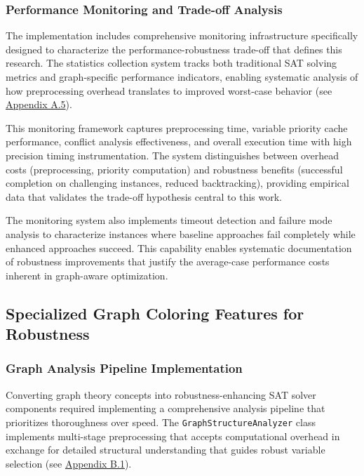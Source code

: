\subsubsection{Performance Monitoring and Trade-off Analysis}

The implementation includes comprehensive monitoring infrastructure specifically designed to characterize the performance-robustness trade-off that defines this research. The statistics collection system tracks both traditional SAT solving metrics and graph-specific performance indicators, enabling systematic analysis of how preprocessing overhead translates to improved worst-case behavior (see \hyperref[appendix:performance-monitoring]{Appendix A.5}).

This monitoring framework captures preprocessing time, variable priority cache performance, conflict analysis effectiveness, and overall execution time with high precision timing instrumentation. The system distinguishes between overhead costs (preprocessing, priority computation) and robustness benefits (successful completion on challenging instances, reduced backtracking), providing empirical data that validates the trade-off hypothesis central to this work.

The monitoring system also implements timeout detection and failure mode analysis to characterize instances where baseline approaches fail completely while enhanced approaches succeed. This capability enables systematic documentation of robustness improvements that justify the average-case performance costs inherent in graph-aware optimization.

\subsection{Specialized Graph Coloring Features for Robustness}

\subsubsection{Graph Analysis Pipeline Implementation}

Converting graph theory concepts into robustness-enhancing SAT solver components required implementing a comprehensive analysis pipeline that prioritizes thoroughness over speed. The \texttt{GraphStructureAnalyzer} class implements multi-stage preprocessing that accepts computational overhead in exchange for detailed structural understanding that guides robust variable selection (see \hyperref[appendix:graph-structure]{Appendix B.1}).

